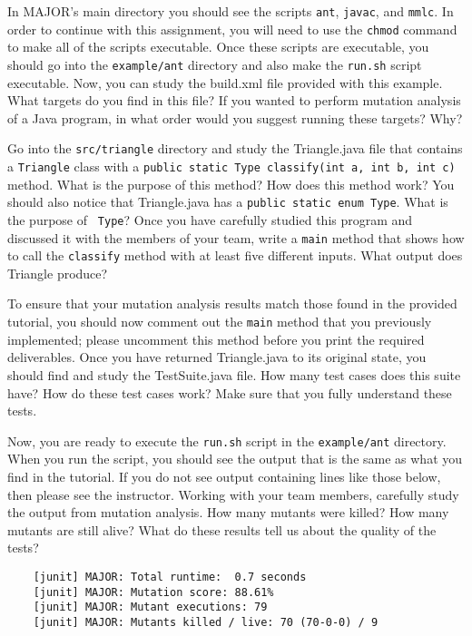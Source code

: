 In MAJOR's main directory you should see the scripts {\tt ant}, {\tt javac}, and {\tt mmlc}.  In order to continue
with this assignment, you will need to use the {\tt chmod} command to make all of the scripts executable.  Once these
scripts are executable, you should go into the {\tt example/ant} directory and also make the {\tt run.sh} script
executable.  Now, you can study the build.xml file provided with this example. What targets do you find in this file? If
you wanted to perform mutation analysis of a Java program, in what order would you suggest running these targets? Why?

Go into the {\tt src/triangle} directory and study the Triangle.java file that contains a {\tt Triangle} class with a
{\tt public static Type classify(int a, int b, int c)} method.  What is the purpose of this method? How does this method
work?  You should also notice that Triangle.java has a {\tt public static enum Type}.  What is the purpose of {\tt
Type}? Once you have carefully studied this program and discussed it with the members of your team, write a {\tt main}
method that shows how to call the {\tt classify} method with at least five different inputs. What output does Triangle
produce? 

To ensure that your mutation analysis results match those found in the provided tutorial, you should now comment out the
{\tt main} method that you previously implemented; please uncomment this method before you print the required
deliverables. Once you have returned Triangle.java to its original state, you should find and study the TestSuite.java
file.  How many test cases does this suite have? How do these test cases work? Make sure that you fully understand these
tests.

Now, you are ready to execute the {\tt run.sh} script in the {\tt example/ant} directory.  When you run the script, you
should see the output that is the same as what you find in the tutorial.  If you do not see output containing lines like
those below, then please see the instructor. Working with your team members, carefully study the output from mutation
analysis.  How many mutants were killed? How many mutants are still alive? What do these results tell us about the
quality of the tests?

\begin{verbatim}
    [junit] MAJOR: Total runtime:  0.7 seconds
    [junit] MAJOR: Mutation score: 88.61%
    [junit] MAJOR: Mutant executions: 79
    [junit] MAJOR: Mutants killed / live: 70 (70-0-0) / 9
\end{verbatim}

